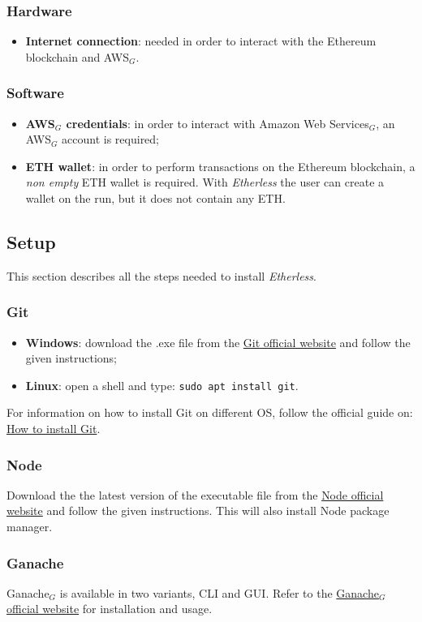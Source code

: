 \subsubsection{Hardware}
\begin{itemize}
	\item \textbf{Internet connection}: needed in order to interact with the Ethereum blockchain and AWS$_{G}$.
\end{itemize}
\subsubsection{Software}
\begin{itemize}
	\item \textbf{AWS$_{G}$ credentials}: in order to interact with Amazon Web Services$_{G}$, an AWS$_{G}$ account is required;
	\item \textbf{ETH wallet}: in order to perform transactions on the Ethereum blockchain, a \textit{non empty} ETH wallet is required. With \textit{Etherless} the user can create a wallet on the run, but it does not contain any ETH.
\end{itemize}
\subsection{Setup}
This section describes all the steps needed to install \textit{Etherless}.
\subsubsection{Git}
\begin{itemize}
	\item \textbf{Windows}: download the .exe file from the \href{https://git-scm.com/download/win}{Git official website} and follow the given instructions;
	\item \textbf{Linux}: open a shell and type: \texttt{sudo apt install git}.
\end{itemize}
	For information on how to install Git on different OS, follow the official guide on: \href{https://git-scm.com/book/en/v2/Getting-Started-Installing-Git}{How to install Git}.
\subsubsection{Node}
	Download the the latest version of the executable file from the \href{https://nodejs.org/it/download/}{Node official website} and follow the given instructions. This will also install Node package manager.
\subsubsection{Ganache}
	Ganache$_{G}$ is available in two variants, CLI and GUI. Refer to the \href{https://www.trufflesuite.com/docs/ganache/quickstart}{Ganache$_{G}$ official website} for installation and usage.
